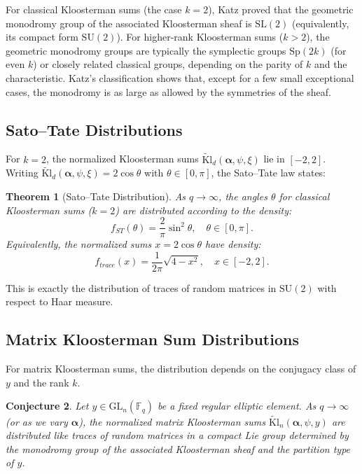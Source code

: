 \documentclass[11pt]{article}
\newtheorem{theorem}{Theorem}[section]
\newtheorem{conjecture}[theorem]{Conjecture}  %
\newcommand{\Fq}{\mathbb{F}_q}
\newcommand{\GL}{\mathrm{GL}}
\newcommand{\tKl}{\widetilde{\mathrm{Kl}}}
\newcommand{\SL}{\mathrm{SL}}
\newcommand{\SU}{\mathrm{SU}}
\newcommand{\Sp}{\mathrm{Sp}}
\begin{document}
For classical Kloosterman sums (the case \(k=2\)), Katz proved that the geometric
monodromy group of the associated Kloosterman sheaf is \(\SL(2)\) (equivalently,
its compact form \(\SU(2)\)). For higher-rank Kloosterman sums (\(k>2\)), the
geometric monodromy groups are typically the symplectic groups \(\Sp(2k)\) (for
even \(k\)) or closely related classical groups, depending on the parity of \(k\)
and the characteristic. Katz’s classification shows that, except for a few small
exceptional cases, the monodromy is as large as allowed by the symmetries of the
sheaf.

\subsection{Sato–Tate Distributions}

For $k=2$, the normalized Kloosterman sums $\tKl_d(\bm{\alpha}, \psi, \xi)$ lie in $[-2,2]$. Writing $\tKl_d(\bm{\alpha}, \psi, \xi) = 2\cos\theta$ with $\theta \in [0,\pi]$, the Sato–Tate law states:
\medskip

\begin{theorem}[Sato–Tate Distribution] \cite{Katz88}
As $q \to \infty$, the angles $\theta$ for classical Kloosterman sums ($k=2$) are distributed according to the density:
\[
f_{ST}(\theta) = \frac{2}{\pi} \sin^2\theta, \quad \theta \in [0,\pi].
\]
Equivalently, the normalized sums $x = 2\cos\theta$ have density:
\[
f_{trace}(x) = \frac{1}{2\pi} \sqrt{4 - x^2}, \quad x \in [-2,2].
\]
\end{theorem}

This is exactly the distribution of traces of random matrices in $\SU(2)$ with respect to Haar measure.

\subsection{Matrix Kloosterman Sum Distributions}

For matrix Kloosterman sums, the distribution depends on the conjugacy class of $y$ and the rank $k$.
\medskip

\begin{conjecture}
Let $y \in \GL_n(\Fq)$ be a fixed regular elliptic element. As $q \to \infty$ (or as we vary $\bm{\alpha}$), the normalized matrix Kloosterman sums $\tKl_n(\bm{\alpha}, \psi, y)$ are distributed like traces of random matrices in a compact Lie group determined by the monodromy group of the associated Kloosterman sheaf and the partition type of $y$.
\end{conjecture}
\end{document}
